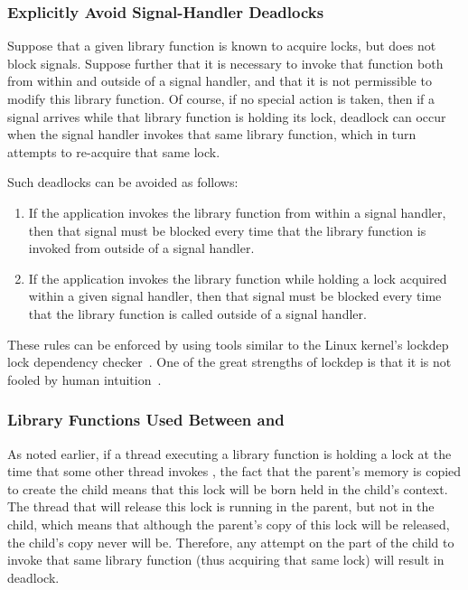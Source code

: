 \subsubsection{Explicitly Avoid Signal-Handler Deadlocks}
\label{sec:locking:Explicitly Avoid Signal-Handler Deadlocks}

Suppose that a given library function is known to acquire locks,
but does not block signals.
Suppose further that it is necessary to invoke that function both from
within and outside of a signal handler, and that it is not permissible
to modify this library function.
Of course, if no special action is taken, then if a signal arrives
while that library function is holding its lock, deadlock can occur
when the signal handler invokes that same library function,
which in turn attempts to re-acquire that same lock.

Such deadlocks can be avoided as follows:

\begin{enumerate}
\item	If the application invokes the library function from
	within a signal handler, then that signal must be blocked
	every time that the library function is invoked from outside
	of a signal handler.
\item	If the application invokes the library function
	while holding a lock acquired within a given signal
	handler, then that signal must be blocked every time that the
	library function is called outside of a signal handler.
\end{enumerate}

These rules can be enforced by using tools similar to
the Linux kernel's lockdep lock dependency
checker~\cite{JonathanCorbet2006lockdep}.
One of the great strengths of lockdep is that it is not fooled by
human intuition~\cite{StevenRostedt2011locdepCryptic}.

\subsubsection{Library Functions Used Between  and }
\label{sec:locking:Library Functions Used Between fork() and exec()}

As noted earlier, if a thread executing a library function is holding
a lock at the time that some other thread invokes , the
fact that the parent's memory is copied to create the child means that
this lock will be born held in the child's context.
The thread that will release this lock is running in the parent, but
not in the child, which means that although the parent's copy of this
lock will be released, the child's copy never will be.
Therefore, any attempt on the part of the child to invoke that same
library function (thus acquiring that same lock) will result in deadlock.

